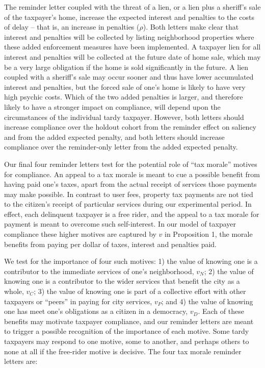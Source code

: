 \documentclass[12pt]{article}
\begin{document}
\bigskip

The reminder letter coupled with the threat of a lien, or a lien plus
a sheriff's sale of the taxpayer's home, increase the expected
interest and penalties to the costs of delay -- that is, an increase
in penalties ($\rho$).  Both letters make clear that interest and
penalties will be collected by listing neighborhood properties where
these added enforcement measures have been implemented.  A taxpayer
lien for all interest and penalties will be collected at the future
date of home sale, which may be a very large obligation if the home is
sold significantly in the future.  A lien coupled with a sheriff's
sale may occur sooner and thus have lower accumulated interest and
penalties, but the forced sale of one's home is likely to have very
high psychic costs.  Which of the two added penalties is larger, and
therefore likely to have a stronger impact on compliance, will depend
upon the circumstances of the individual tardy taxpayer.
However, both letters should increase compliance over the holdout
cohort from the reminder effect on saliency and from the added
expected penalty, and both letters should increase compliance over the
reminder-only letter from the added expected penalty.

Our final four reminder letters test for the potential role of ``tax
morale'' motives for compliance.  An appeal to a tax morale is meant
to cue a possible benefit from having paid one's taxes, apart from the
actual receipt of services those payments may make possible.  In
contrast to user fees, property tax payments are not tied to the
citizen's receipt of particular services during our experimental
period.  In effect, each delinquent taxpayer is a free rider, and the
appeal to a tax morale for payment is meant to overcome such
self-interest.  In our model of taxpayer compliance these higher
motives are captured by $v$ in Proposition 1, the morale benefits
from paying per dollar of taxes, interest and penalties paid.

We test for the importance of four such motives: 1) the value of
knowing one is a contributor to the immediate services of one's
neighborhood, $v_{N}$; 2) the value of knowing one is a contributor to
the wider services that benefit the city as a whole, $v_{C}$; 3) the
value of knowing one is part of a collective effort with other
taxpayers or ``peers'' in paying for city services, $v_{P}$; and 4)
the value of knowing one has meet one's obligations as a citizen in a
democracy, $v_{D}$.  Each of these benefits may motivate taxpayer
compliance, and our reminder letters are meant to trigger a possible
recognition of the importance of each motive.  Some tardy
taxpayers may respond to one motive, some to another, and perhaps
others to none at all if the free-rider motive is decisive.  The four
tax morale reminder letters are:
\end{document}
